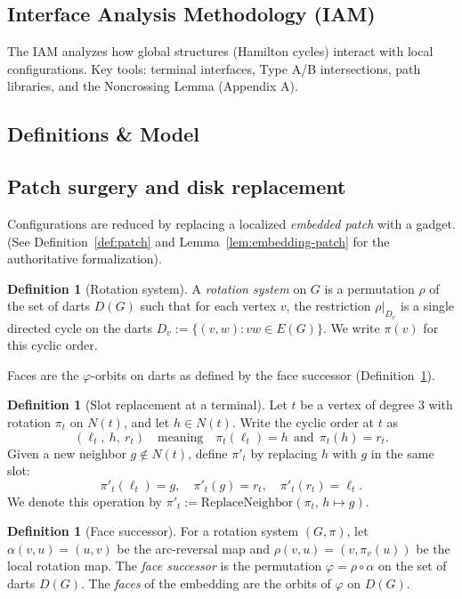 \documentclass[12pt]{article}
\theoremstyle{definition}
\newtheorem{definition}[theorem]{Definition}
\begin{document}
\subsection{Interface Analysis Methodology (IAM)}
The IAM analyzes how global structures (Hamilton cycles) interact with local configurations. Key tools: terminal interfaces, Type A/B intersections, path libraries, and the Noncrossing Lemma (Appendix A).

\subsection{Definitions \& Model}
\label{subsec:definitions-model}



\subsection{Patch surgery and disk replacement}
\label{subsec:patch-surgery}

Configurations are reduced by replacing a localized \emph{embedded patch} with a gadget.
(See Definition~\ref{def:patch} and Lemma~\ref{lem:embedding-patch} for the authoritative formalization).

\begin{definition}[Rotation system]\label{def:rotation-system}
A \emph{rotation system} on $G$ is a permutation $\rho$ of the set of darts $D(G)$ such that for each vertex $v$, the restriction $\rho|_{D_v}$ is a single directed cycle on the darts $D_v:=\{(v,w): vw\in E(G)\}$. We write $\pi(v)$ for this cyclic order.
\end{definition}

Faces are the $\varphi$-orbits on darts as defined by the face successor (Definition~\ref{def:face-successor}).

\begin{definition}[Slot replacement at a terminal]\label{def:replace-neighbor}
Let $t$ be a vertex of degree $3$ with rotation $\pi_t$ on $N(t)$, and let $h\in N(t)$.
Write the cyclic order at $t$ as
\[
(\ell_t,\ h,\ r_t)
\quad\text{meaning}\quad
\pi_t(\ell_t)=h\ \ \text{and}\ \ \pi_t(h)=r_t .
\]
Given a new neighbor $g\notin N(t)$, define $\pi'_t$ by replacing $h$ with $g$ in the same slot:
\[
\pi'_t(\ell_t)=g,\quad \pi'_t(g)=r_t,\quad \pi'_t(r_t)=\ell_t .
\]
We denote this operation by $\pi'_t:=\mathrm{ReplaceNeighbor}(\pi_t,\,h\mapsto g)$.
\end{definition}

\begin{definition}[Face successor]\label{def:face-successor}
For a rotation system $(G, \pi)$, let $\alpha(v,u)=(u,v)$ be the arc-reversal map and $\rho(v,u)=(v,\pi_v(u))$ be the local rotation map. The \emph{face successor} is the permutation $\varphi = \rho \circ \alpha$ on the set of darts $D(G)$. The \emph{faces} of the embedding are the orbits of $\varphi$ on $D(G)$.
\end{definition}
\end{document}
